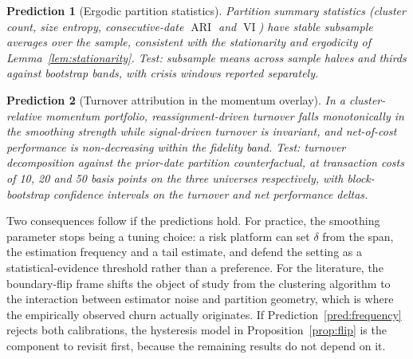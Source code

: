 \documentclass[11pt]{article}
\newtheorem{prediction}{Prediction}
\theoremstyle{remark}
\newcommand{\ARI}{\operatorname{ARI}}
\newcommand{\VI}{\operatorname{VI}}
\begin{document}
\begin{prediction}[Ergodic partition statistics]
\label{pred:ergodicity}
Partition summary statistics (cluster count, size entropy, consecutive-date
$\ARI$ and $\VI$) have stable subsample averages over the sample, consistent
with the stationarity and ergodicity of Lemma~\ref{lem:stationarity}. Test:
subsample means across sample halves and thirds against bootstrap bands, with
crisis windows reported separately.
\end{prediction}

\begin{prediction}[Turnover attribution in the momentum overlay]
\label{pred:turnover}
In a cluster-relative momentum portfolio, reassignment-driven turnover falls
monotonically in the smoothing strength while signal-driven turnover is
invariant, and net-of-cost performance is non-decreasing within the fidelity
band. Test: turnover decomposition against the prior-date partition
counterfactual, at transaction costs of 10, 20 and 50 basis points on the
three universes respectively, with block-bootstrap confidence intervals on the
turnover and net performance deltas.
\end{prediction}

Two consequences follow if the predictions hold. For practice, the smoothing
parameter stops being a tuning choice: a risk platform can set $\delta$ from
the span, the estimation frequency and a tail estimate, and defend the setting
as a statistical-evidence threshold rather than a preference. For the
literature, the boundary-flip frame shifts the object of study from the
clustering algorithm to the interaction between estimator noise and partition
geometry, which is where the empirically observed churn actually originates.
If Prediction~\ref{pred:frequency} rejects both calibrations, the hysteresis
model in Proposition~\ref{prop:flip} is the component to revisit first,
because the remaining results do not depend on it.



\end{document}

